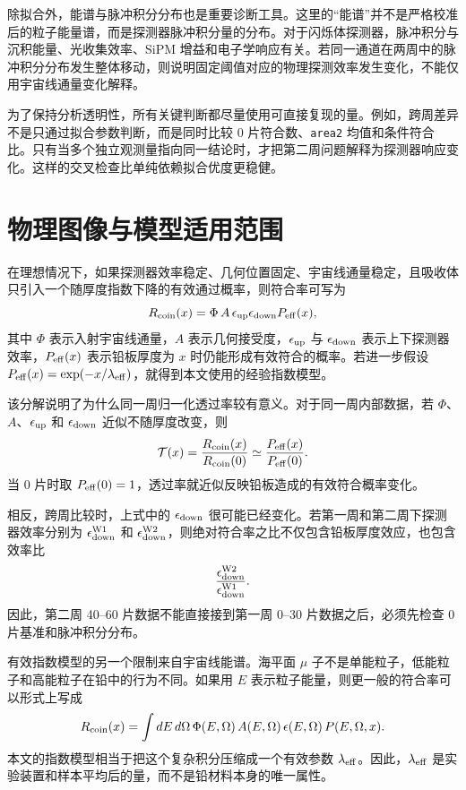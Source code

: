 \documentclass[aps,prl,twocolumn,superscriptaddress,nofootinbib]{revtex4-2}
\begin{document}
除拟合外，能谱与脉冲积分分布也是重要诊断工具。这里的“能谱”并不是严格校准后的粒子能量谱，而是探测器脉冲积分量的分布。对于闪烁体探测器，脉冲积分与沉积能量、光收集效率、SiPM 增益和电子学响应有关。若同一通道在两周中的脉冲积分分布发生整体移动，则说明固定阈值对应的物理探测效率发生变化，不能仅用宇宙线通量变化解释。

为了保持分析透明性，所有关键判断都尽量使用可直接复现的量。例如，跨周差异不是只通过拟合参数判断，而是同时比较 0 片符合数、\texttt{area2} 均值和条件符合比。只有当多个独立观测量指向同一结论时，才把第二周问题解释为探测器响应变化。这样的交叉检查比单纯依赖拟合优度更稳健。

\section{物理图像与模型适用范围}

在理想情况下，如果探测器效率稳定、几何位置固定、宇宙线通量稳定，且吸收体只引入一个随厚度指数下降的有效通过概率，则符合率可写为
\begin{equation}
R_{\rm coin}(x)=\Phi\, A\, \epsilon_{\rm up}\epsilon_{\rm down}
P_{\rm eff}(x),
\end{equation}
其中 $\Phi$ 表示入射宇宙线通量，$A$ 表示几何接受度，$\epsilon_{\rm up}$ 与 $\epsilon_{\rm down}$ 表示上下探测器效率，$P_{\rm eff}(x)$ 表示铅板厚度为 $x$ 时仍能形成有效符合的概率。若进一步假设 $P_{\rm eff}(x)=\exp(-x/\lambda_{\rm eff})$，就得到本文使用的经验指数模型。

该分解说明了为什么同一周归一化透过率较有意义。对于同一周内部数据，若 $\Phi$、$A$、$\epsilon_{\rm up}$ 和 $\epsilon_{\rm down}$ 近似不随厚度改变，则
\begin{equation}
\mathcal{T}(x)=\frac{R_{\rm coin}(x)}{R_{\rm coin}(0)}
\simeq \frac{P_{\rm eff}(x)}{P_{\rm eff}(0)} .
\end{equation}
当 0 片时取 $P_{\rm eff}(0)=1$，透过率就近似反映铅板造成的有效符合概率变化。

相反，跨周比较时，上式中的 $\epsilon_{\rm down}$ 很可能已经变化。若第一周和第二周下探测器效率分别为 $\epsilon_{\rm down}^{\rm W1}$ 和 $\epsilon_{\rm down}^{\rm W2}$，则绝对符合率之比不仅包含铅板厚度效应，也包含效率比
\begin{equation}
\frac{\epsilon_{\rm down}^{\rm W2}}{\epsilon_{\rm down}^{\rm W1}} .
\end{equation}
因此，第二周 40--60 片数据不能直接接到第一周 0--30 片数据之后，必须先检查 0 片基准和脉冲积分分布。

有效指数模型的另一个限制来自宇宙线能谱。海平面 $\mu$ 子不是单能粒子，低能粒子和高能粒子在铅中的行为不同。如果用 $E$ 表示粒子能量，则更一般的符合率可以形式上写成
\begin{equation}
R_{\rm coin}(x)=\int dE\, d\Omega\,
\Phi(E,\Omega)\, A(E,\Omega)\,
\epsilon(E,\Omega)\, P(E,\Omega,x).
\end{equation}
本文的指数模型相当于把这个复杂积分压缩成一个有效参数 $\lambda_{\rm eff}$。因此，$\lambda_{\rm eff}$ 是实验装置和样本平均后的量，而不是铅材料本身的唯一属性。
\end{document}
